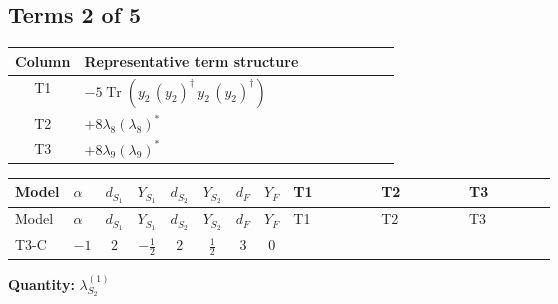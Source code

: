 \documentclass[8pt]{article}
\begin{document}
\begin{landscape}
\subsection*{Terms 2 of 5}
\begin{center}
\begin{tabular}{@{}c >{\raggedright\arraybackslash}p{0.82\linewidth}@{}}
\toprule
Column & Representative term structure \\
\midrule
T1 & \(\displaystyle -5 \operatorname{Tr}\!\left({y_2}\,\left({y_2}\right)^{\dagger}\,{y_2}\,\left({y_2}\right)^{\dagger}\right)\) \\
\midrule
T2 & \(\displaystyle +8 {\lambda_{8}} \left({\lambda_{8}}\right)^{*}\) \\
\midrule
T3 & \(\displaystyle +8 {\lambda_{9}} \left({\lambda_{9}}\right)^{*}\) \\
\midrule
\bottomrule
\end{tabular}
\end{center}
\smallskip
\tiny
\begin{longtable}{@{}llcccccc >{\raggedright\arraybackslash}p{0.21\linewidth} >{\raggedright\arraybackslash}p{0.21\linewidth} >{\raggedright\arraybackslash}p{0.21\linewidth}@{}}
\toprule
Model & $\alpha$ & $d_{S_1}$ & $Y_{S_1}$ & $d_{S_2}$ & $Y_{S_2}$ & $d_F$ & $Y_F$ & T1 & T2 & T3 \\
\midrule
\endfirsthead
\toprule
Model & $\alpha$ & $d_{S_1}$ & $Y_{S_1}$ & $d_{S_2}$ & $Y_{S_2}$ & $d_F$ & $Y_F$ & T1 & T2 & T3 \\
\midrule
\endhead
T3-C & $-1$ & $2$ & $-\frac{1}{2}$ & $2$ & $\frac{1}{2}$ & $3$ & $0$ & \scriptsize\adjustbox{max width=\linewidth}{$\begin{gathered} -5 \operatorname{Tr}\!\left({y_2}\,\left({y_2}\right)^{\dagger}\,{y_2}\,\left({y_2}\right)^{\dagger}\right)\end{gathered}$} & \scriptsize\adjustbox{max width=\linewidth}{$\begin{gathered} +8 {\lambda_{8}} \left({\lambda_{8}}\right)^{*}\end{gathered}$} & \scriptsize\adjustbox{max width=\linewidth}{$\begin{gathered} +8 {\lambda_{9}} \left({\lambda_{9}}\right)^{*}\end{gathered}$} \\
\midrule
\bottomrule
\end{longtable}
\clearpage
\noindent\textbf{Quantity: }$\lambda_{S_2}^{(1)}$\par\smallskip

\end{landscape}
\end{document}
